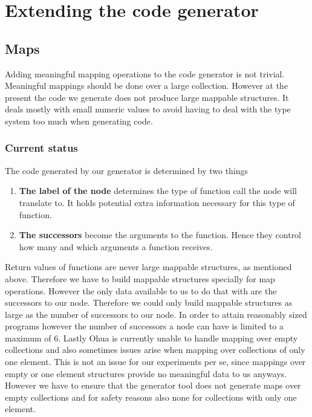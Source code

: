 \chapter{Extending the code generator}

\label{ch:extending-code-generator}

\section{Maps}

Adding meaningful mapping operations to the code generator is not trivial.
Meaningful mappings should be done over a large collection.
However at the present the code we generate does not produce large mappable structures.
It deals mostly with small numeric values to avoid having to deal with the type system too much when generating code.

\subsection{Current status}

The code generated by our generator is determined by two things

\begin{enumerate}
    \item \textbf{The label of the node} determines the type of function call the node will translate to.
          It holds potential extra information necessary for this type of function.
    \item \textbf{The successors} become the arguments to the function. Hence they control how many and which arguments a function receives.
\end{enumerate}

Return values of functions are never large mappable structures, as mentioned above.
Therefore we have to build mappable structures specially for map operations.
However the only data available to us to do that with are the successors to our node.
Therefore we could only build mappable structures as large as the number of successors to our node.
In order to attain reasonably sized programs however the number of successors a node can have is limited to a maximum of 6.
Lastly Ohua is currently unable to handle mapping over empty collections and also sometimes issues arise when mapping over collections of only one element.
This is not an issue for our experiments per se, since mappings over empty or one element structures provide no meaningful data to us anyways.
However we have to ensure that the generator tool does not generate maps over empty collections and for safety reasons also none for collections with only one element.

